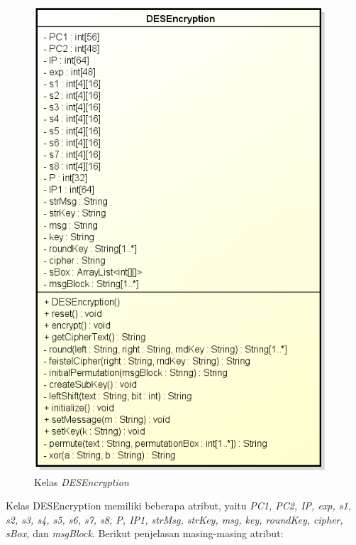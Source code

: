 \begin{figure}[H]
	\centering
	\includegraphics[scale=0.6]{Gambar/class_des_encryption}
	\caption{Kelas \textit{DESEncryption}}\label{fig:classdesencryption}
\end{figure}

Kelas DESEncryption memiliki beberapa atribut, yaitu \textit{PC1, PC2, IP, exp, s1, s2, s3, s4, s5, s6, s7, s8, P, IP1, strMsg, strKey, msg, key, roundKey, cipher, sBox,} dan \textit{msgBlock}. Berikut penjelasan masing-masing atribut:

